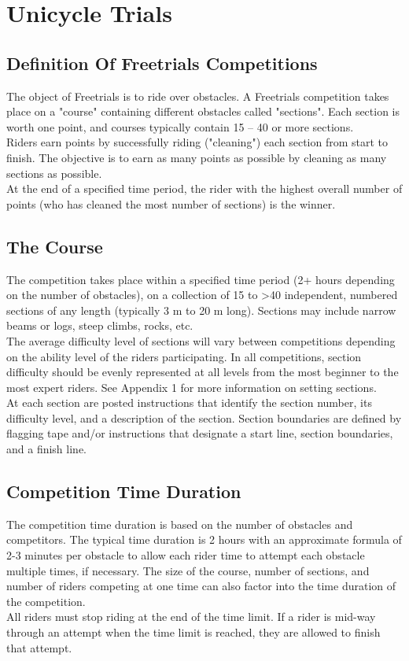 \chapter{Unicycle Trials}

\section{Definition Of Freetrials Competitions}
The object of Freetrials is to ride over obstacles. A Freetrials competition takes place on a "course" containing different
obstacles called "sections". Each section is worth one point, and courses typically contain 15 – 40 or more sections.\\
Riders earn points by successfully riding ("cleaning") each section from start to finish. The objective is to earn as many
points as possible by cleaning as many sections as possible.\\
At the end of a specified time period, the rider with the highest overall number of points (who has cleaned the most
number of sections) is the winner.

\section{The Course}
The competition takes place within a specified time period (2+ hours depending on the number of obstacles), on a
collection of 15 to >40 independent, numbered sections of any length (typically 3 m to 20 m long). Sections may include
narrow beams or logs, steep climbs, rocks, etc.\\
The average difficulty level of sections will vary between competitions depending on the ability level of the riders
participating. In all competitions, section difficulty should be evenly represented at all levels from the most beginner to the
most expert riders. See Appendix 1 for more information on setting sections.\\
At each section are posted instructions that identify the section number, its difficulty level, and a description of the section.
Section boundaries are defined by flagging tape and/or instructions that designate a start line, section boundaries, and a
finish line.

\section{Competition Time Duration}
The competition time duration is based on the number of obstacles and competitors. The typical time duration is 2 hours
with an approximate formula of 2-3 minutes per obstacle to allow each rider time to attempt each obstacle multiple times,
if necessary. The size of the course, number of sections, and number of riders competing at one time can also factor into
the time duration of the competition.\\
All riders must stop riding at the end of the time limit. If a rider is mid-way through an attempt when the time limit is
reached, they are allowed to finish that attempt.

